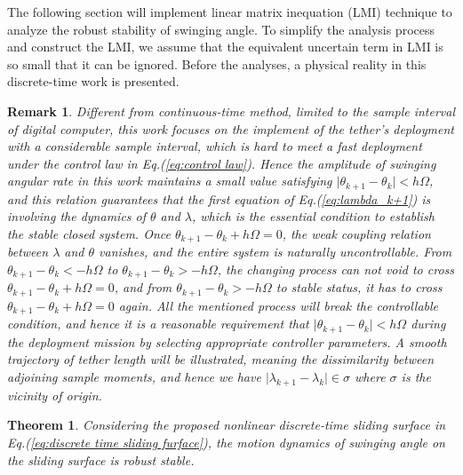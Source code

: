 \documentclass[10pt,final,journal]{IEEEtran}
\newtheorem{myrem}{Remark}
\newtheorem{mythm}{Theorem}
\begin{document}
	The following section will implement linear matrix inequation (LMI) technique to analyze the robust stability of swinging angle. To simplify the analysis process and construct the LMI, we assume that the equivalent uncertain term in LMI is so small that it can be ignored. Before the analyses, a physical reality in this discrete-time work is presented.
	\begin{myrem}\label{rem:2}
		Different from continuous-time method, limited to the sample interval of digital computer, this work focuses on the implement of the tether's deployment with a considerable sample interval, which is hard to meet a fast deployment under the control law in Eq.(\ref{eq:control law}). Hence the amplitude of swinging angular rate in this work maintains a small value satisfying $\vert\theta_{k+1}-\theta_k\vert<h\Omega$,  and this relation guarantees that the first equation of Eq.(\ref{eq:lambda_k+1}) is involving the dynamics of $\theta$ and $\lambda$, which is the essential condition to establish the stable closed system. Once $\theta_{k+1}-\theta_k+h\Omega=0$, the weak coupling relation between $\lambda$ and $\theta$ vanishes, and the entire system is naturally uncontrollable. From $\theta_{k+1}-\theta_k<-h\Omega$ to $\theta_{k+1}-\theta_k>-h\Omega$, the changing process can not void to cross $\theta_{k+1}-\theta_k+h\Omega=0$, and from $\theta_{k+1}-\theta_k>-h\Omega$ to stable status, it has to cross $\theta_{k+1}-\theta_k+h\Omega=0$ again. All the mentioned process will break the controllable condition, and hence it is a reasonable requirement that $\vert\theta_{k+1}-\theta_k\vert<h\Omega$ during the deployment mission by selecting appropriate controller parameters. A smooth trajectory of tether length will be illustrated, meaning the dissimilarity between adjoining sample moments, and hence we have $\vert\lambda_{k+1}-\lambda_{k}\vert\in \sigma$ where $\sigma$ is the vicinity of origin.  
	\end{myrem}
	\begin{mythm}
		Considering the proposed nonlinear discrete-time sliding surface in Eq.(\ref{eq:discrete time sliding furface}), the motion dynamics of swinging angle on the sliding surface is robust stable.
	\end{mythm}
\end{document}
